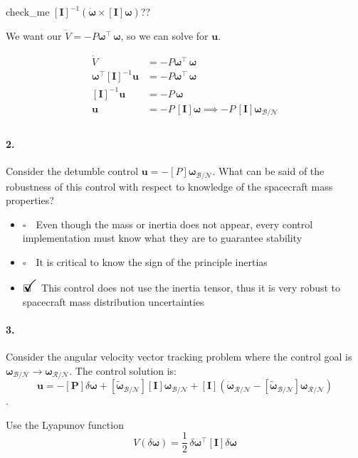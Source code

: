 \documentclass[12pt, a4paper]{article}
\newcommand{\ans}{\item[]$\rlap{\LARGE{\checkmark}}\square\quad$}
\newcommand{\noans}{\item[]$\square\quad$}
\begin{document}
check\_me $[\bm{I}]^{-1}(\dot{\bm{\omega}}\times[\bm{I}]\bm{\omega})$??

We want our $\dot{V}=-P\bm{\omega}^{\intercal}\,\bm{\omega}$, so we can solve for $\bm{u}$.

\begin{equation*}
    \begin{split}
        \dot{V}&=-P\bm{\omega}^{\intercal}\,\bm{\omega}\\
        \bm{\omega}^{\intercal}[\bm{I}]^{-1}\bm{u}&=-P\bm{\omega}^{\intercal}\,\bm{\omega}\\
        [\bm{I}]^{-1}\bm{u}&=-P\,\bm{\omega}\\
        \bm{u}&=-P\,[\bm{I}]\bm{\omega}\implies-P\,[\bm{I}]\bm{\omega}_{\mathcal{B}/\mathcal{N}}\\
    \end{split}
\end{equation*}

\paragraph{2.}
Consider the detumble control $\bm{u} = - [P]\bm{\omega}_{\mathcal{B}/\mathcal{N}}$. What can be said of the robustness of this control with respect to knowledge of the spacecraft mass properties?

\begin{itemize}
\noans Even though the mass or inertia does not appear, every control implementation must know what they are to guarantee stability
\noans It is critical to know the sign of the principle inertias
\ans This control does not use the inertia tensor, thus it is very robust to spacecraft mass distribution uncertainties
\end{itemize}

\paragraph{3.}
Consider the angular velocity vector tracking problem where the control goal is $\bm{\omega}_{\mathcal{B}/\mathcal{N}} \rightarrow \bm{\omega}_{\mathcal{R}/\mathcal{N}}$. The control solution is:
$$\bm{u}=-[\bm{P}]\delta \bm{\omega} + [\tilde{\bm{\omega}}_{\mathcal{B}/\mathcal{N}}][\bm{I}]\bm{\omega}_{\mathcal{B}/\mathcal{N}} + [\bm{I}]\left(\dot{\bm{\omega}}_{\mathcal{R}/\mathcal{N}} - [\tilde{\bm{\omega}}_{\mathcal{B}/\mathcal{N}}] \bm{\omega}_{\mathcal{R}/\mathcal{N}}\right)$$.

Use the Lyapunov function
$$ V(\delta \bm{\omega}) = \frac{1}{2}\, \delta \bm{\omega}^{\intercal}[\bm{I}]\delta\bm{\omega}$$
\end{document}
